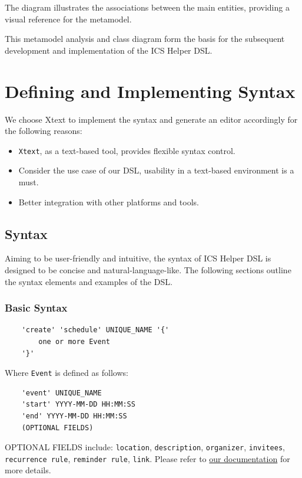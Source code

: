 \documentclass[12pt, letterpaper, twoside]{article}
\begin{document}
The diagram illustrates the associations between the main entities, providing a visual reference for the metamodel.

This metamodel analysis and class diagram form the basis for the subsequent development and implementation of the ICS Helper DSL.


\newpage
\section{Defining and Implementing Syntax}
We choose Xtext to implement the syntax and generate an editor accordingly for the following reasons:

\begin{itemize}
    \item \texttt{Xtext}, as a text-based tool, provides flexible syntax control.
    \item Consider the use case of our DSL, usability in a text-based environment is a must.
    \item Better integration with other platforms and tools.
\end{itemize}

\subsection{Syntax}
Aiming to be user-friendly and intuitive, the syntax of ICS Helper DSL is designed to be concise and natural-language-like. 
The following sections outline the syntax elements and examples of the DSL.
\subsubsection{Basic Syntax}
\begin{verbatim}
    'create' 'schedule' UNIQUE_NAME '{'
        one or more Event
    '}'
\end{verbatim}

Where \texttt{Event} is defined as follows:

\begin{verbatim}
    'event' UNIQUE_NAME
    'start' YYYY-MM-DD HH:MM:SS
    'end' YYYY-MM-DD HH:MM:SS
    (OPTIONAL FIELDS)
\end{verbatim}
OPTIONAL FIELDS include: \texttt{location}, \texttt{description}, \texttt{organizer}, \texttt{invitees}, \texttt{recurrence rule}, \texttt{reminder rule}, \texttt{link}. 
Please refer to \href{https://github.com/Gudauu/ICS-Helper}{our documentation} for more details.
\end{document}
